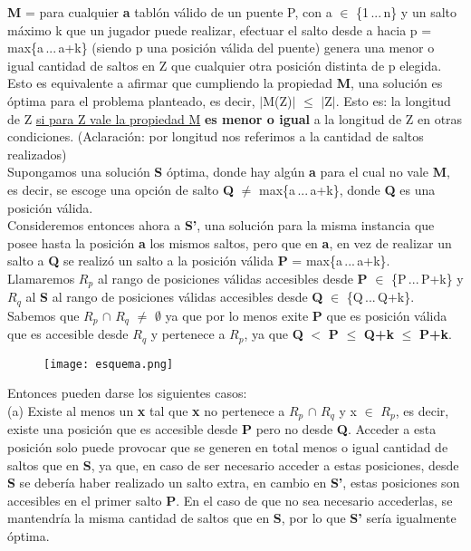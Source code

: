 \textbf{M} = para cualquier \textbf{a} tabl\'on v\'alido de un puente P, con a $\in$ \{1\,...\,n\} y un salto m\'aximo k que un jugador puede realizar, efectuar el salto desde a hacia p = max\{a\,...\,a+k\} (siendo p una posici\'on v\'alida del puente) genera una menor o igual cantidad de saltos en Z que cualquier otra posici\'on distinta de p elegida.\\

Esto es equivalente a afirmar que cumpliendo la propiedad \textbf{M}, una solución es \'optima para el problema planteado, es decir, $\vert$M(Z)$\vert$ $\leq$ $\vert$Z$\vert$. Esto es: la longitud de Z  \underline{si para Z vale la propiedad M} \textbf{es menor o igual} a la longitud de Z en otras condiciones. (Aclaraci\'on: por longitud nos referimos a la cantidad de saltos realizados) \\

Supongamos una solución \textbf{S} óptima, donde hay algún \textbf{a} para el cual no vale \textbf{M}, es decir, se escoge una opción de salto \textbf{Q} $\neq$ max\{a\,...\,a+k\}, donde \textbf{Q} es una posición válida.\\
Consideremos entonces ahora a \textbf{S'}, una solución para la misma instancia que posee hasta la posición \textbf{a} los mismos saltos, pero que en \textbf{a}, en vez de realizar un salto a \textbf{Q} se realizó un salto a la posición válida \textbf{P} = max\{a\,...\,a+k\}.\\
Llamaremos $R_{p}$ al rango de posiciones válidas accesibles desde \textbf{P} $\in$ \{P\,...\,P+k\} y $R_{q}$ al \textbf{S} al rango de posiciones válidas accesibles desde \textbf{Q} $\in$ \{Q\,...\,Q+k\}.\\
Sabemos que $R_{p}$ $\cap$ $R_{q}$ $\neq$ $\emptyset$ ya que por lo menos exite \textbf{P} que es posición válida que es accesible desde $R_{q}$ y pertenece a $R_{p}$, ya que \textbf{Q} $<$ \textbf{P} $\leq$ \textbf{Q+k} $\leq$ \textbf{P+k}.

	\begin{figure}[h]
		\begin{center}
		   \texttt{[image: esquema.png]}
		\end{center}
	\end{figure}

Entonces pueden darse los siguientes casos:\\

(a) Existe al menos un \textbf{x} tal que \textbf{x} no pertenece a $R_{p}$ $\cap$ $R_{q}$ y x $\in$ $R_{p}$, es decir, existe una posición que es accesible desde \textbf{P} pero no desde \textbf{Q}. Acceder a esta posición solo puede provocar que se generen en total menos o igual cantidad de saltos que en \textbf{S}, ya que, en caso de ser necesario acceder a estas posiciones, desde \textbf{S} se debería haber realizado un salto extra, en cambio en \textbf{S'}, estas posiciones son accesibles en el primer salto \textbf{P}.
En el caso de que no sea necesario accederlas, se mantendría la misma cantidad de saltos que en \textbf{S}, por lo que \textbf{S'} sería igualmente óptima.\\


